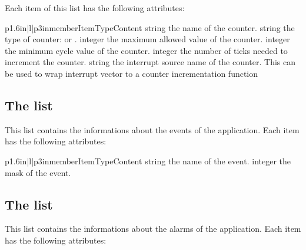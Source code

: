 Each item of this list has the following attributes:

\begin{longtableiii}{p{1.6in}|l|p{3in}}{member}{Item}{Type}{Content}
  {string}
  {the name of the counter.}
  {string}
  {the type of counter: {\small{}} or {\small{}}.}
  {integer}
  {the maximum allowed value of the counter.}
  {integer}
  {the minimum cycle value of the counter.}
  {integer}
  {the number of ticks needed to increment the counter.}
  {string}
  {the interrupt source name of the counter. This can be used to wrap interrupt vector to a counter incrementation function}
\end{longtableiii}

\subsection{The  list}

This list contains the informations about the events of the application. Each item has the following attributes:

\begin{longtableiii}{p{1.6in}|l|p{3in}}{member}{Item}{Type}{Content}
  {string}
  {the name of the event.}
  {integer}
  {the mask of the event.}
\end{longtableiii}

\subsection{The  list}

This list contains the informations about the alarms of the application. Each item has the following attributes:

